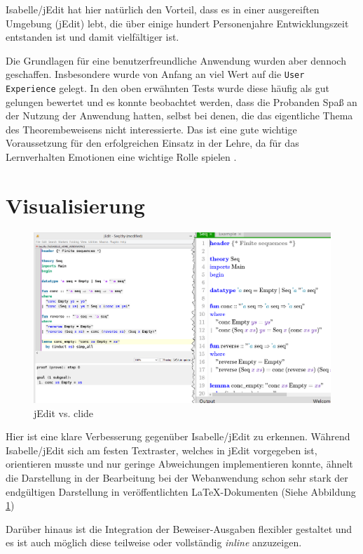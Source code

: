 Isabelle/jEdit hat hier natürlich den Vorteil, dass es in einer ausgereiften Umgebung (jEdit) lebt,
die über einige hundert Personenjahre Entwicklungszeit entstanden ist und damit vielfältiger ist.

Die Grundlagen für eine benutzerfreundliche Anwendung wurden aber dennoch geschaffen. Insbesondere
wurde von Anfang an viel Wert auf die \texttt{User Experience} gelegt. In den oben erwähnten Tests
wurde diese häufig als gut gelungen bewertet und es konnte beobachtet werden, dass die Probanden
Spaß an der Nutzung der Anwendung hatten, selbst bei denen, die das eigentliche Thema des
Theorembeweisens nicht interessierte. Das ist eine gute wichtige Voraussetzung für den erfolgreichen
Einsatz in der Lehre, da für das Lernverhalten Emotionen eine wichtige Rolle spielen
\cite{emotionaldesign}.

\section{Visualisierung}

\begin{figure}[ht]
\includegraphics[width=\linewidth]{images/jedit}
  \caption{jEdit vs. clide}
  \label{fig:jedit}
\end{figure}

Hier ist eine klare Verbesserung gegenüber Isabelle/jEdit zu erkennen. Während Isabelle/jEdit sich
am festen Textraster, welches in jEdit vorgegeben ist, orientieren musste und nur geringe
Abweichungen implementieren konnte, ähnelt die Darstellung in der Bearbeitung bei der Webanwendung
schon sehr stark der endgültigen Darstellung in veröffentlichten \LaTeX-Dokumenten (Siehe
Abbildung\,\ref{fig:jedit})

Darüber hinaus ist die Integration der Beweiser-Ausgaben flexibler gestaltet und es ist auch möglich
diese teilweise oder vollständig \textit{inline} anzuzeigen.

